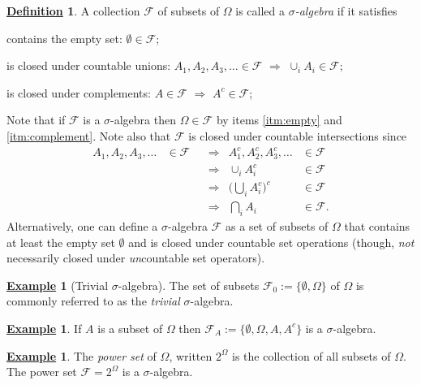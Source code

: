 \documentclass[12pt]{book}
\numberwithin{equation}{chapter}
\theoremstyle{plain}
\numberwithin{theorem}{section}
\theoremstyle{definition}
\newtheorem{definition}[theorem]{\underline{Definition}}
\newtheorem{example}[theorem]{\underline{Example}}
\numberwithin{exercise}{chapter}
\newcommand{\<}{\langle}
\renewcommand{\>}{\rangle}
\renewcommand{\(}{\left(}
\renewcommand{\)}{\right)}
\renewcommand{\[}{\left[}
\renewcommand{\]}{\right]}
\newcommand\Fc{\mathscr{F}}
\newcommand\Om{\Omega}
\newcommand\sig{\sigma}
\begin{document}
\begin{definition}
A collection $\Fc$ of subsets of $\Om$ is called a \emph{$\sig$-algebra} if it satisfies
\begin{enumerate*}%
\item contains the empty set: $\emptyset \in \Fc$; \label{itm:empty}
\item is closed under countable unions: $A_1, A_2, A_3, \ldots \in \Fc$ $\Rightarrow$ $\cup_i A_i \in \Fc$; \label{itm:countable.union}
\item is closed under complements: $A \in \Fc$ $\Rightarrow$ $A^c \in \Fc$; \label{itm:complement}
\end{enumerate*}
\end{definition}

\noindent
Note that if $\Fc$ is a $\sig$-algebra then $\Om \in \Fc$ by items \ref{itm:empty} and \ref{itm:complement}.  Note also that $\Fc$ is closed under countable intersections since
\begin{align}
A_1, A_2, A_3, \ldots
	&\in \Fc &
	&\Rightarrow&
A_1^c, A_2^c, A_3^c, \ldots
	&\in \Fc \\ & & &\Rightarrow&
\cup_i A_i^c
	&\in \Fc \\ & & &\Rightarrow&
\Big( \bigcup_i A_i^c \Big)^c
	&\in \Fc \\ & & &\Rightarrow&
\bigcap_i A_i
	&\in \Fc .
\end{align}
Alternatively, one can define a $\sig$-algebra $\Fc$ as a set of subsets of $\Om$ that contains at least the empty set $\emptyset$ and is closed under countable set operations (though, \emph{not} necessarily closed under \emph{un}countable set operators).

\begin{example}[Trivial $\sig$-algebra]
The set of subsets $\Fc_0 := \{\emptyset, \Om \}$ of $\Om$ is commonly referred to as the \emph{trivial} $\sig$-algebra.
\end{example}

\begin{example}
If $A$ is a subset of $\Om$ then $\Fc_A := \{ \emptyset, \Om, A, A^c \}$ is a $\sig$-algebra.
\end{example}

\begin{example}
The \emph{power set} of $\Om$, written $2^\Om$ is the collection of all subsets of $\Om$.  The power set $\Fc = 2^\Om$ is a $\sig$-algebra.
\end{example}
\end{document}
